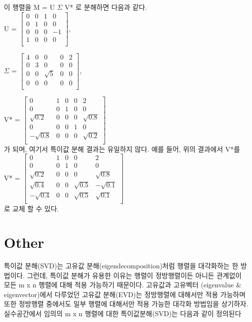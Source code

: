 \documentclass[a4paper,
              ]{jacow}
\begin{document}
이 행렬을 M = U $\Sigma$ V* 로 분해하면 다음과 같다.\\
 U = $
 \begin{bmatrix}
 0 & 0 & 1 & 0 \\
 0 & 1 & 0 & 0 \\
 0 & 0 & 0 & -1 \\
 1 & 0 & 0 & 0 \\
 \end{bmatrix}$, 

$\Sigma$ = $
\begin{bmatrix}
4 & 0 & 0 & 0 & 2\\
0 & 3 & 0 & 0 & 0\\
0 & 0 & \sqrt{5} & 0 & 0\\
0 & 0 & 0 & 0 & 0\\
\end{bmatrix}$, 

V* = $
\begin{bmatrix}
0 & 1 & 0 & 0 & 2\\
0 & 0 & 1 & 0 & 0\\
\sqrt{0.2} & 0 & 0 & 0 & \sqrt{0.8}\\
0 & 0 & 0 & 1 & 0\\
-\sqrt{0.8} & 0 & 0 & 0 & \sqrt{0.2}\\
\end{bmatrix}$ \\

가 되며, 여기서 특이값 분해 결과는 유일하지 않다. 예를 들어, 위의 결과에서 V*를 \\

V* = $
\begin{bmatrix}
0 & 1 & 0 & 0 & 2\\
0 & 0 & 1 & 0 & 0\\
\sqrt{0.2} & 0 & 0 & 0 & \sqrt{0.8}\\
\sqrt{0.4} & 0 & 0 & \sqrt{0.5} & -\sqrt{0.1}\\
-\sqrt{0.4} & 0 & 0 & \sqrt{0.5} & \sqrt{0.1}\\
\end{bmatrix}$ \\
 
 로 교체 할 수 있다.

\section{Other}
특이값 분해(SVD)는 고유값 분해(eigendecomposition)처럼 행렬을 대각화하는 한 방법이다. 그런데, 특이값 분해가 유용한 이유는 행렬이 정방행렬이든 아니든 관계없이 모든 m x n 행렬에 대해 적용 가능하기 때문이다. 고유값과 고유벡터 (eigenvalue \& eigenvector)에서 다루었던 고유값 분해(EVD)는 정방행렬에 대해서만 적용 가능하며 또한 정방행렬 중에서도 일부 행렬에 대해서만 적용 가능한 대각화 방법임을 상기하자. 실수공간에서 임의의 m x n 행렬에 대한 특이값분해(SVD)는 다음과 같이 정의된다
\end{document}
